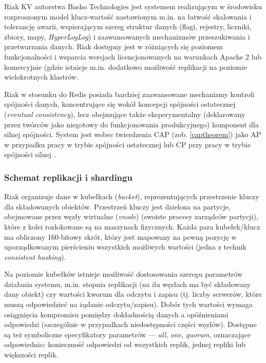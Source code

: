 Riak KV autorstwa Basho Technologies jest systemem realizującym w środowisku rozproszonym model klucz-wartość nastawionym m.in. na łatwość skalowania i tolerancję awarii, wspierającym szereg struktur danych (flagi, rejestry, liczniki, zbiory, mapy, \textit{HyperLogLog}) i zaawansowanych mechanizmów przeszukiwania i przetwarzania danych. Riak dostępny jest w różniących się poziomem funkcjonalności i wsparcia wersjach licencjonowanych na warunkach Apache 2 lub komercyjnie (gdzie istnieje m.in. dodatkowo możliwość replikacji na poziomie wielokrotnych klastrów.

Riak w stosunku do Redis posiada bardziej zaawansowane mechanizmy kontroli spójności danych, koncentrujące się wokół koncepcji spójności ostatecznej (\textit{eventual consistency}), lecz obejmujące także eksperymentalny (deklarowany przez twórców jako niegotowy do funkcjonowania produkcyjnego) komponent dla silnej spójności. System jest wobec twierdzenia CAP (zob. \ref{captheorem}) jako AP w przypadku pracy w trybie spójności ostatecznej lub CP przy pracy w trybie spójności silnej \cite{riakreplprop}.

\subsubsection*{Schemat replikacji i shardingu}

Riak organizuje dane w kubełkach (\textit{bucket}), reprezentujących przestrzenie kluczy dla składowanych obiektów. Przestrzeń kluczy jest dzielona na partycje, obejmowane przez węzły wirtualne (\textit{vnode}) (swoiste procesy zarządców partycji), które z kolei rozlokowane są na maszynach fizycznych. Każda para kubełek/klucz ma obliczony 160-bitowy skrót, który jest mapowany na pewną pozycję w uporządkowanym pierścieniu wszystkich możliwych wartości (jedna z technik \textit{consistent hashing}).

Na poziomie kubełków istnieje możliwość dostosowania szeregu parametrów działania systemu, m.in. stopnia replikacji (na ilu węzłach ma być składowany dany obiekt) czy wartości kworum dla odczytu i zapisu (tj. liczby serwerów, które muszą odpowiedzieć na żądanie odczytu/zapisu). Dobór tych wartości wymaga osiągnięcia kompromisu pomiędzy dokładnością danych a opóźnieniami odpowiedzi (szczególnie w przypadkach niedostępności części węzłów). Dostępne są też symboliczne specyfikatory parametrów --- \textit{all}, \textit{one}, \textit{quorum}, oznaczające odpowiednio: konieczność odpowiedzi od wszystkich replik, jednej repliki lub większości replik.

